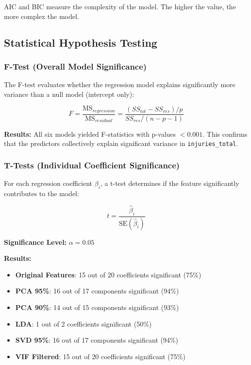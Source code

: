 \documentclass[stu,12pt,floatsintext]{apa7}
\begin{document}
AIC and BIC measure the complexity of the model. The higher the value, the more complex the model.

\subsection{Statistical Hypothesis Testing}

\subsubsection{F-Test (Overall Model Significance)}

The F-test evaluates whether the regression model explains significantly more variance than a null model (intercept only):

\begin{equation}
F = \frac{\mathrm{MS}_{regression}}{\mathrm{MS}_{residual}} = \frac{(SS_{tot} - SS_{res}) / p}{SS_{res} / (n - p - 1)}
\end{equation}

\textbf{Results:} All six models yielded F-statistics with p-values $< 0.001$. 
This confirms that the predictors collectively explain significant variance in \texttt{injuries\_total}.

\subsubsection{T-Tests (Individual Coefficient Significance)}

For each regression coefficient $\beta_i$, a t-test determines if the feature significantly contributes to the model:

\begin{equation}
t = \frac{\hat{\beta}_i}{\mathrm{SE}(\hat{\beta}_i)}
\end{equation}

\textbf{Significance Level:} $\alpha = 0.05$

\textbf{Results:}
\begin{itemize}
    \item \textbf{Original Features}: 15 out of 20 coefficients significant (75\%)
    \item \textbf{PCA 95\%}: 16 out of 17 components significant (94\%)
    \item \textbf{PCA 90\%}: 14 out of 15 components significant (93\%)
    \item \textbf{LDA}: 1 out of 2 coefficients significant (50\%)
    \item \textbf{SVD 95\%}: 16 out of 17 components significant (94\%)
    \item \textbf{VIF Filtered}: 15 out of 20 coefficients significant (75\%)
\end{itemize}
\end{document}
